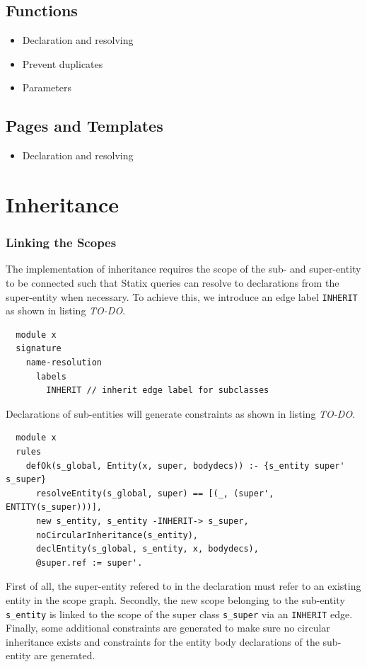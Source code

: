     \subsection{\label{subsec:simple-functions}Functions}

      \begin{itemize}
        \item Declaration and resolving
        \item Prevent duplicates
        \item Parameters
      \end{itemize}

    \subsection{\label{subsec:simple-pages}Pages and Templates}

      \begin{itemize}
        \item Declaration and resolving
      \end{itemize}

  \section{\label{sec:inheritance}Inheritance}

    \subsubsection{Linking the Scopes}
      The implementation of inheritance requires the scope of the sub- and super-entity to be connected such that Statix queries can resolve to declarations from the super-entity when necessary. To achieve this, we introduce an edge label \texttt{INHERIT} as shown in listing \emph{TO-DO}.
      \begin{verbatim}
  module x
  signature
    name-resolution
      labels
        INHERIT // inherit edge label for subclasses
      \end{verbatim}
      Declarations of sub-entities will generate constraints as shown in listing \emph{TO-DO}.
      \begin{verbatim}
  module x
  rules
    defOk(s_global, Entity(x, super, bodydecs)) :- {s_entity super' s_super}
      resolveEntity(s_global, super) == [(_, (super', ENTITY(s_super)))],
      new s_entity, s_entity -INHERIT-> s_super,
      noCircularInheritance(s_entity),
      declEntity(s_global, s_entity, x, bodydecs),
      @super.ref := super'.
      \end{verbatim}
      First of all, the super-entity refered to in the declaration must refer to an existing entity in the scope graph. Secondly, the new scope belonging to the sub-entity \texttt{s\_entity} is linked to the scope of the super class \texttt{s\_super} via an \texttt{INHERIT} edge. Finally, some additional constraints are generated to make sure no circular inheritance exists and constraints for the entity body declarations of the sub-entity are generated.

